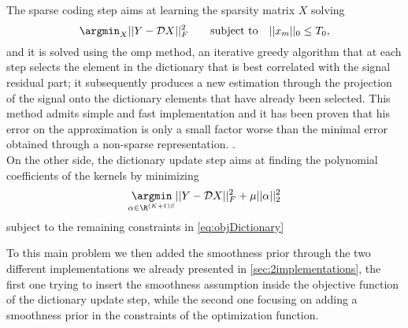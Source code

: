 The sparse coding step aims at learning the sparsity matrix $X$ solving
\begin{equation}
  \argmin_{X} ||Y - \mathcal{D}X||^2_F \qquad \text{subject to} \quad ||x_m||_0 \leq T_0,
\end{equation}
and it is solved using the \gls{omp} method, an iterative greedy algorithm that at each step selects the element in the dictionary that is best correlated with the signal residual part; it subsequently produces a new estimation through the projection of the signal onto the dictionary elements that have already been selected. This method admits simple and fast implementation and it has been proven that his error on the approximation is only a small factor worse than the minimal error obtained through a non-sparse representation. \cite{Tropp2004}.\\

On the other side, the dictionary update step aims at finding the polynomial coefficients of the kernels by minimizing
\begin{equation}
  \underset{{\alpha \in \R^{(K+1)S}}}{\argmin} ||Y - \mathcal{D}X||^2_F + \mu||\alpha||_2^2
\end{equation}
subject to the remaining constraints in \autoref{eq:objDictionary}

To this main problem we then added the smoothness prior through the two different implementations we already presented in \autoref{sec:2implementations}, the first one trying to insert the smoothness assumption inside the objective function of the dictionary update step, while the second one focusing on adding a smoothness prior in the constraints of the optimization function.

